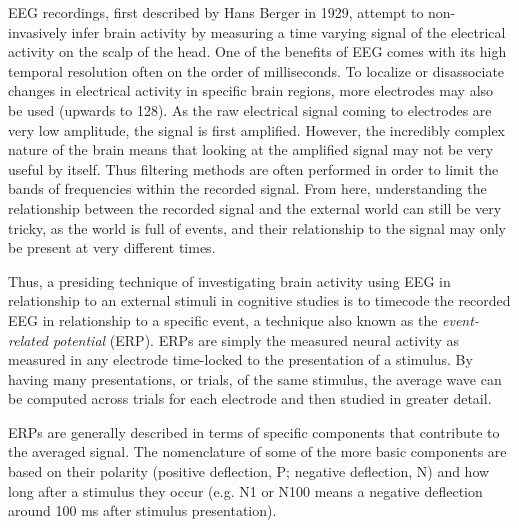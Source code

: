 EEG recordings, first described by Hans Berger in 1929, attempt to non-invasively infer brain activity by measuring a time varying signal of the electrical activity on the scalp of the head.  One of the benefits of EEG comes with its high temporal resolution often on the order of milliseconds.  To localize or disassociate changes in electrical activity in specific brain regions, more electrodes may also be used (upwards to 128).  As the raw electrical signal coming to electrodes are very low amplitude, the signal is first amplified.  However, the incredibly complex nature of the brain means that looking at the amplified signal may not be very useful by itself.  Thus filtering methods are often performed in order to limit the bands of frequencies within the recorded signal.  From here, understanding the relationship between the recorded signal and the external world can still be very tricky, as the world is full of events, and their relationship to the signal may only be present at very different times.  

Thus, a presiding technique of investigating brain activity using EEG in relationship to an external stimuli in cognitive studies is to timecode the recorded EEG in relationship to a specific event, a technique also known as the \textit{event-related potential} (ERP).  ERPs are simply the measured neural activity as measured in any electrode time-locked to the presentation of a stimulus.  By having many presentations, or trials, of the same stimulus, the average wave can be computed across trials for each electrode and then studied in greater detail.  

ERPs are generally described in terms of specific components that contribute to the averaged signal.  The nomenclature of some of the more basic components are based on their polarity (positive deflection, P; negative deflection, N) and how long after a stimulus they occur (e.g. N1 or N100 means a negative deflection around 100 ms after stimulus presentation).  


